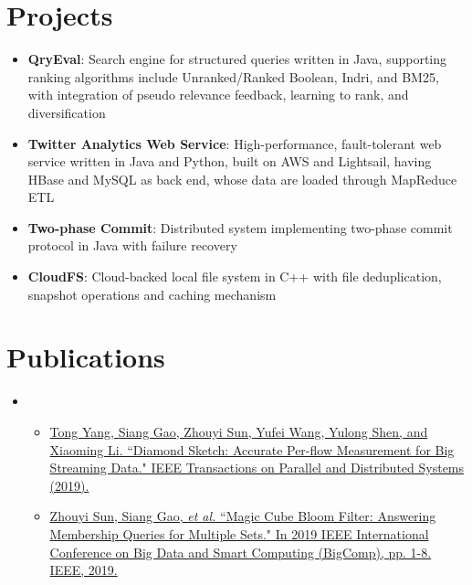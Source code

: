 \documentclass[letterpaper,11pt]{article}
\newcommand{\resumeItem}[2]{
  \item[]\small{
    \textbf{#1}{: #2 \vspace{-2pt}}
  }
}
\newcommand{\resumeItemCustom}[1]{
  \item[$\bullet$]\small{
    #1 \vspace{-2pt}
  }
}
\newcommand{\resumeSubItem}[2]{\resumeItem{\small#1}{\small#2}\vspace{-4pt}}
\newcommand{\resumeSubHeadingListStart}{\begin{itemize}[leftmargin=*]}
\newcommand{\resumeSubHeadingListEnd}{\end{itemize}}
\newcommand{\resumeItemListStart}{\begin{itemize}}
\newcommand{\resumeItemListEnd}{\end{itemize}\vspace{-5pt}}
\begin{document}
\section{Projects}
  \resumeSubHeadingListStart
    \resumeSubItem{QryEval}
      {Search engine for structured queries written in Java, supporting ranking algorithms include
        Unranked/Ranked Boolean, Indri, and BM25, with integration of pseudo relevance feedback, learning to rank, and diversification}
    \resumeSubItem{Twitter Analytics Web Service}
      {
        High-performance, fault-tolerant
        web service written in Java and Python, built on AWS and Lightsail,
        having HBase and MySQL as back end,
        whose 
        data are loaded through MapReduce ETL
      }
    \resumeSubItem{Two-phase Commit}
      {Distributed system implementing two-phase commit protocol in Java with failure recovery}
    \resumeSubItem{CloudFS}
      {Cloud-backed local file system in C++ with file deduplication, snapshot operations and caching mechanism}
  \resumeSubHeadingListEnd

\section{Publications}
    \resumeSubHeadingListStart
      \item[]
      \resumeItemListStart
        \resumeItemCustom{
            \href{https://ieeexplore.ieee.org/document/8742627}
            {Tong Yang, \underline{Siang Gao}, Zhouyi Sun, Yufei Wang, Yulong Shen, and Xiaoming Li. ``Diamond Sketch: Accurate Per-flow Measurement for Big Streaming Data." IEEE Transactions on Parallel and Distributed Systems (2019).
            }
        }
        \resumeItemCustom{
            \href{https://ieeexplore.ieee.org/document/8679119}
            {Zhouyi Sun, \underline{Siang Gao}, \textit{et al.} ``Magic Cube Bloom Filter: Answering Membership Queries for Multiple Sets." In 2019 IEEE International Conference on Big Data and Smart Computing (BigComp), pp. 1-8. IEEE, 2019.
            }
        }
      \resumeItemListEnd
    \resumeSubHeadingListEnd
\end{document}
